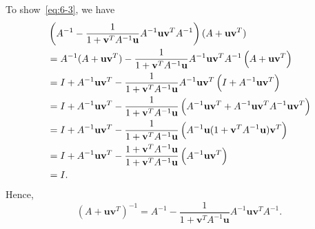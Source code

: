 \documentclass{article}
\def\*#1{\mathbf{#1}}
\begin{document}
%
To show~\eqref{eq:6-3}, we have
%
\begin{align*}
    &\del{A^{-1} - \frac{1}{1 + \*v^T A^{-1} \*u} A^{-1} \*u \*v^T A^{-1}} (A + \*u \*v^T) \\
    &=  A^{-1} (A + \*u \*v^T)
        - \frac{1}{1 + \*v^T A^{-1} \*u} A^{-1} \*u \*v^T A^{-1}
            \del{
            A
            + \*u \*v^T
            }
        \\
    &=  I + A^{-1} \*u \*v^T
        - \frac{1}{1 + \*v^T A^{-1} \*u} A^{-1} \*u \*v^T
            \del{
            I
            + A^{-1} \*u \*v^T
            }
        \\
    &=  I + A^{-1} \*u \*v^T
        - \frac{1}{1 + \*v^T A^{-1} \*u}
            \del{
            A^{-1} \*u \*v^T
            +
            A^{-1} \*u \*v^T
            A^{-1} \*u \*v^T
            }
        \\
    &=  I + A^{-1} \*u \*v^T
        - \frac{1}{1 + \*v^T A^{-1} \*u}
            \del{
                A^{-1} \*u (1 + \*v^T A^{-1} \*u) \*v^T
            }
        \\
    &=  I + A^{-1} \*u \*v^T
        - \frac{1 + \*v^T A^{-1} \*u}{1 + \*v^T A^{-1} \*u}
            \del{
                A^{-1} \*u \*v^T
            }
        \\
    &= I
    .
\end{align*}
%
Hence,
%
\begin{equation*}
    (A + \*u \*v^T)^{-1} = A^{-1} - \frac{1}{1 + \*v^T A^{-1} \*u} A^{-1} \*u \*v^T A^{-1}.
\end{equation*}
\end{document}
